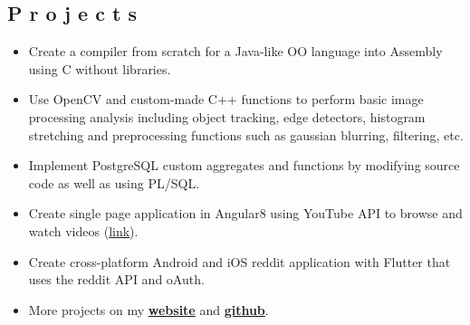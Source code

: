 \documentclass{resume}
\begin{document}

\subsection{P r o j e c t s}
\begin{itemize}
\item \small Create a compiler from scratch for a Java-like OO language into Assembly using C without libraries.
\item \small Use OpenCV and custom-made C++ functions to perform basic image processing analysis including object tracking, edge detectors, histogram stretching and preprocessing functions such as gaussian blurring, filtering, etc.
\item \small Implement PostgreSQL custom aggregates and functions by modifying source code as well as using PL/SQL.
\item \small Create single page application in Angular8 using YouTube API to browse and watch videos (\href{https://github.com/mushfiq814/youtube-data-api-dogVids}{link}).
\item \small Create cross-platform Android and iOS reddit application with Flutter that uses the reddit API and oAuth.
\item \small More projects on my \href{https://mushfiqmahmud.com/html/projects}{\textbf{website}} and \href{https://github.com/mushfiq814}{\textbf{github}}.
\end{itemize}

\end{document}
